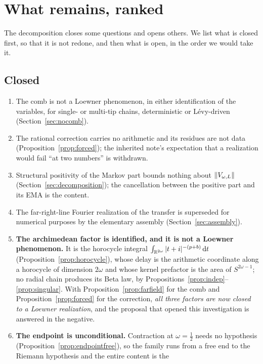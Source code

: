 \section{What remains, ranked}\label{sec:outlook}

The decomposition closes some questions and opens others. We list what is
closed first, so that it is not redone, and then what is open, in the order we
would take it.

\subsection{Closed}

\begin{enumerate}
\item The comb is not a Loewner phenomenon, in either identification of the
variables, for single- or multi-tip chains, deterministic or L\'evy-driven
(Section~\ref{sec:nocomb}).
\item The rational correction carries no arithmetic and its residues are not
data (Proposition~\ref{prop:forced}); the inherited note's expectation that a
realization would fail ``at two numbers'' is withdrawn.
\item Structural positivity of the Markov part bounds nothing about
$\lVert V_{\omega,L}\rVert$ (Section~\ref{sec:decomposition}); the cancellation
between the positive part and its EMA is the content.
\item The far-right-line Fourier realization of the transfer is superseded for
numerical purposes by the elementary assembly (Section~\ref{sec:assembly}).
\item \textbf{The archimedean factor is identified, and it is not a Loewner
phenomenon.} It is the horocycle integral $\int_{\mathbb R^{2\omega}}|t+i|^{-(p+b)}\,\mathrm d t$
(Proposition~\ref{prop:horocycle}), whose delay is the arithmetic coordinate
along a horocycle of dimension $2\omega$ and whose kernel prefactor is the area
of $S^{2\omega-1}$; no radial chain produces its Beta law, by
Propositions~\ref{prop:indep}--\ref{prop:singular}. With
Proposition~\ref{prop:farfield} for the comb and Proposition~\ref{prop:forced}
for the correction, \emph{all three factors are now closed to a Loewner
realization}, and the proposal that opened this investigation is answered in the
negative.
\item \textbf{The endpoint is unconditional.} Contraction at $\omega=\frac12$
needs no hypothesis (Proposition~\ref{prop:endpointfree}), so the family runs
from a free end to the Riemann hypothesis and the entire content is the

\end{enumerate}
